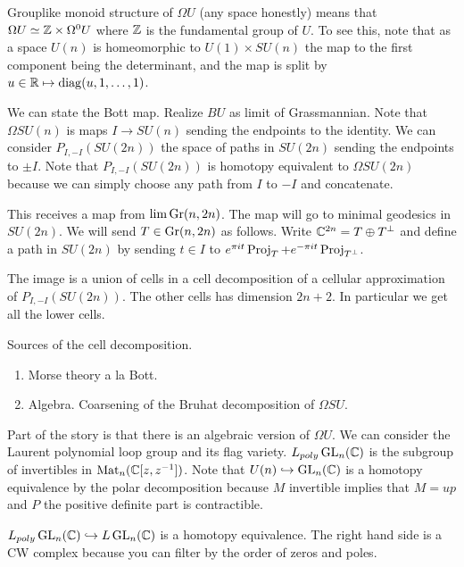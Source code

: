 \documentclass[12pt]{article}
\begin{document}
\begin{remark}
    Grouplike monoid structure of $\Omega U$ (any space honestly) means that $\Omega U \simeq \mathbb{Z} \times \Omega^0 U$ where $\mathbb{Z}$ is the fundamental group of $U$. To see this, note that as a space $U(n)$ is homeomorphic to $U(1) \times SU(n)$ the map to the first component being the determinant, and the map is split by $u \in \mathbb{R} \mapsto \operatorname{diag}(u, 1, \dots, 1)$. 
\end{remark}

We can state the Bott map. Realize $BU$ as limit of Grassmannian. Note that $\Omega SU(n)$ is maps $I \to SU(n)$ sending the endpoints to the identity. We can consider $P_{I,-I}(SU(2n))$ the space of paths in $SU(2n)$ sending the endpoints to $\pm I$. Note that $P_{I,-I}(SU(2n))$ is homotopy equivalent to $\Omega SU(2n)$ because we can simply choose any path from $I$ to $-I$ and concatenate.

This receives a map from $\lim \operatorname{Gr}(n, 2n)$. The map will go to minimal geodesics in $SU(2n)$. We will send $T\in \operatorname{Gr}(n, 2n)$ as follows. Write $\mathbb{C}^{2n} = T \oplus T^\perp$ and define a path in $SU(2n)$ by sending $t \in I$ to $e^{\pi i t} \operatorname{Proj}_T + e^{-\pi i t} \operatorname{Proj}_{T^\perp}$. 

\begin{theorem}
    The image is a union of cells in a cell decomposition of a cellular approximation of $P_{I,-I}(SU(2n))$. The other cells has dimension $2n+2$. In particular we get all the lower cells.
\end{theorem}

Sources of the cell decomposition. \begin{enumerate}
    \item Morse theory a la Bott.
    \item Algebra. Coarsening of the Bruhat decomposition of $\Omega SU$.
\end{enumerate}
Part of the story is that there is an algebraic version of $\Omega U$. We can consider the Laurent polynomial loop group and its flag variety. 
    $L_{poly}\operatorname{GL}_n(\mathbb{C})$ is the subgroup of invertibles in $\operatorname{Mat}_n(\mathbb{C}[z,z^{-1}])$. Note that $U(n) \hookrightarrow \operatorname{GL}_n(\mathbb{C})$ is a homotopy equivalence by the polar decomposition because $M$ invertible implies that $M = up$ and $P$ the positive definite part is contractible. 

    \begin{theorem}
        $L_{poly}\operatorname{GL}_n(\mathbb{C}) \hookrightarrow L\operatorname{GL}_n(\mathbb{C})$ is a homotopy equivalence. The right hand side is a CW complex because you can filter by the order of zeros and poles.
    \end{theorem} 
\end{document}
